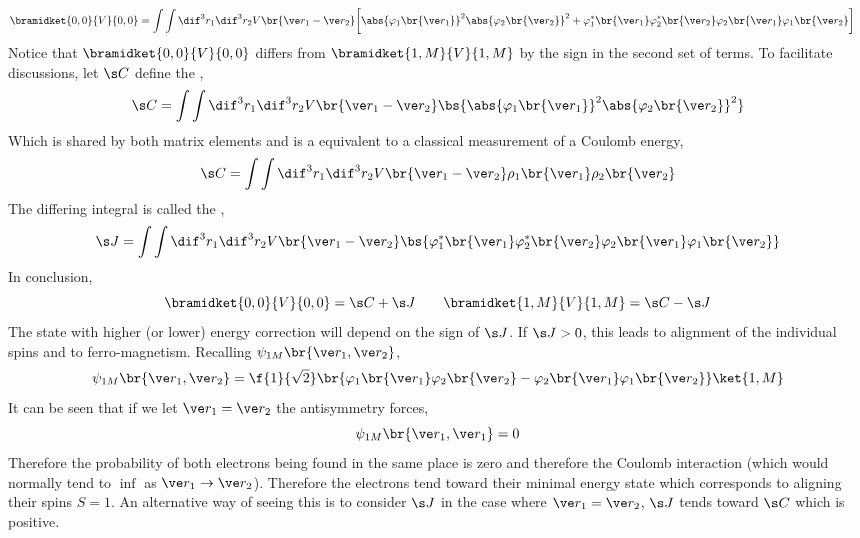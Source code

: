 \documentclass{article}
\begin{document}
\begin{align*}
\bramidket{0,0}{V}{0,0}
&= \int \int \dif^3 r_1 \dif^3 r_2 V\br{\ve r_1 - \ve r_2} \bigg[\abs{\varphi_1\br{\ve r_1}}^2 \abs{\varphi_2\br{\ve r_2}}^2 + \varphi_1^{*}\br{\ve r_1} \varphi_2^{*}\br{\ve r_2}\varphi_2\br{\ve r_1} \varphi_1\br{\ve r_2}\bigg]
\end{align*}
Notice that $\bramidket{0,0}{V}{0,0}$ differs from $\bramidket{1,M}{V}{1,M}$ by the sign in the second set of terms. To facilitate discussions, let $\s C$ define the ,
\[ \s C = \int \int \dif^3 r_1 \dif^3 r_2 V\br{\ve r_1 - \ve r_2} \bs{\abs{\varphi_1\br{\ve r_1}}^2 \abs{\varphi_2\br{\ve r_2}}^2} \]
Which is shared by both matrix elements and is a equivalent to a classical measurement of a Coulomb energy,
\[ \s C = \int \int \dif^3 r_1 \dif^3 r_2 V\br{\ve r_1 - \ve r_2} \rho_1\br{\ve r_1}\rho_2\br{\ve r_2} \]
The differing integral is called the ,
\[ \s J = \int \int \dif^3 r_1 \dif^3 r_2 V\br{\ve r_1 - \ve r_2} \bs{\varphi_1^{*}\br{\ve r_1} \varphi_2^{*}\br{\ve r_2}\varphi_2\br{\ve r_1} \varphi_1\br{\ve r_2}} \]
In conclusion,
\[ \bramidket{0,0}{V}{0,0} = \s C + \s J \qquad \bramidket{1,M}{V}{1,M} = \s C - \s J \]
The state with higher (or lower) energy correction will depend on the sign of $\s J$. If $\s J > 0$, this leads to alignment of the individual spins and to ferro-magnetism. Recalling $\psi_{1M} \br{\ve r_1, \ve r_2}$,
\[ \psi_{1M} \br{\ve r_1, \ve r_2} = \f{1}{\sqrt{2}}\br{\varphi_1\br{\ve r_1} \varphi_2\br{\ve r_2} - \varphi_2\br{\ve r_1} \varphi_1\br{\ve r_2}} \ket{1, M} \]
It can be seen that if we let $\ve r_1 = \ve r_2$ the antisymmetry forces,
\[ \psi_{1M} \br{\ve r_1, \ve r_1} = 0 \]
Therefore the probability of both electrons being found in the same place is zero and therefore the Coulomb interaction (which would normally tend to $\inf$ as $\ve r_1 \to \ve r_2$). Therefore the electrons tend toward their minimal energy state which corresponds to aligning their spins $S = 1$. An alternative way of seeing this is to consider $\s J$ in the case where $\ve r_1 = \ve r_2$, $\s J$ tends toward $\s C$ which is positive.\\
\end{document}
